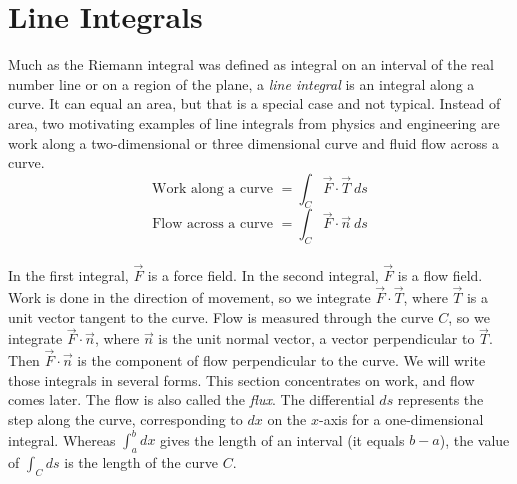 \section{Line Integrals}\label{sec:line_integrals}

Much as the Riemann integral was defined as integral on an interval of the real number line or on a region of the plane,  a \emph{line integral} is an integral along a curve. It can equal an area, but
that is a special case and not typical. Instead of area, two motivating examples of line integrals from physics and engineering are work along a two-dimensional or three dimensional curve and fluid flow across a curve.\\

{
$$\text{Work along a curve } = \int_C \vec F \cdot \vec T \: ds$$
 $$\text{Flow across a curve } = \int_C \vec F \cdot \vec n \: ds$$
}\\

In the first integral, $\vec F$ is a force field. In the second integral, $\vec F$ is a flow field. Work is done in the direction of movement, so we integrate $\vec F \cdot \vec T$, where $\vec T$ is a unit vector tangent to the curve. Flow is measured through the curve $C$, so we integrate $\vec F \cdot \vec n$, where $\vec n$ is the unit normal vector, a vector perpendicular to $\vec T$. Then $\vec F \cdot \vec n$ is the component of flow perpendicular to the curve.
We will write those integrals in several forms. This section concentrates on work, and
flow comes later. The flow is also called the \emph{flux}. The differential $ds$
represents the step along the curve, corresponding to $dx$ on the $x$-axis for a one-dimensional integral. Whereas $\int_a^b dx$ gives the length of an interval (it equals $b - a$), the value of $\int_C ds$ is the length of the curve $C$.\\

